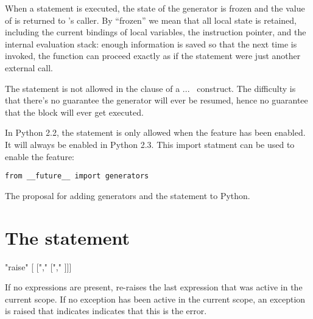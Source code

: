 When a  statement is executed, the state of the
generator is frozen and the value of  is
returned to 's caller.  By ``frozen'' we mean that all
local state is retained, including the current bindings of local
variables, the instruction pointer, and the internal evaluation stack:
enough information is saved so that the next time  is
invoked, the function can proceed exactly as if the 
statement were just another external call.

The  statement is not allowed in the 
clause of a  ...\  construct.  The
difficulty is that there's no guarantee the generator will ever be
resumed, hence no guarantee that the  block will ever
get executed.

\begin{notice}
In Python 2.2, the  statement is only allowed
when the  feature has been enabled.  It will always
be enabled in Python 2.3.  This  import statment can
be used to enable the feature:

\begin{verbatim}
from __future__ import generators
\end{verbatim}
\end{notice}


\begin{seealso}
         {The proposal for adding generators and the 
          statement to Python.}
\end{seealso}


\section{The  statement \label{raise}}

\begin{productionlist}
             {"raise" [ ["," 
              ["," ]]]}
\end{productionlist}

If no expressions are present,  re-raises the last
expression that was active in the current scope.  If no exception has
been active in the current scope, an exception is raised that
indicates indicates that this is the error.

